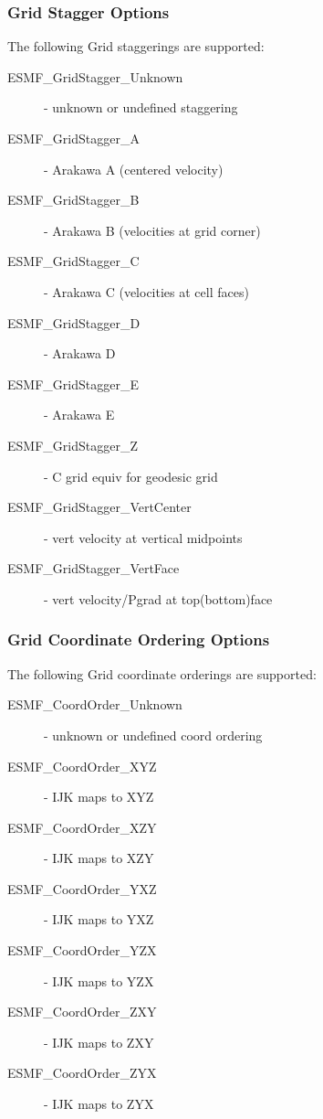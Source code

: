 \subsubsection{Grid Stagger Options}
The following Grid staggerings are supported:
\begin{description}
   \item[ESMF\_GridStagger\_Unknown] - unknown or undefined staggering
   \item[ESMF\_GridStagger\_A] - Arakawa A (centered velocity)
   \item[ESMF\_GridStagger\_B] - Arakawa B (velocities at grid corner)
   \item[ESMF\_GridStagger\_C] - Arakawa C (velocities at cell faces)
   \item[ESMF\_GridStagger\_D] - Arakawa D
   \item[ESMF\_GridStagger\_E] - Arakawa E
   \item[ESMF\_GridStagger\_Z] - C grid equiv for geodesic grid
   \item[ESMF\_GridStagger\_VertCenter] - vert velocity at vertical midpoints
   \item[ESMF\_GridStagger\_VertFace] - vert velocity/Pgrad at top(bottom)face
\end{description}


\subsubsection{Grid Coordinate Ordering Options}
The following Grid coordinate orderings are supported:
\begin{description}
   \item[ESMF\_CoordOrder\_Unknown] - unknown or undefined coord ordering
   \item[ESMF\_CoordOrder\_XYZ] - IJK maps to XYZ
   \item[ESMF\_CoordOrder\_XZY] - IJK maps to XZY
   \item[ESMF\_CoordOrder\_YXZ] - IJK maps to YXZ
   \item[ESMF\_CoordOrder\_YZX] - IJK maps to YZX
   \item[ESMF\_CoordOrder\_ZXY] - IJK maps to ZXY
   \item[ESMF\_CoordOrder\_ZYX] - IJK maps to ZYX
\end{description}
